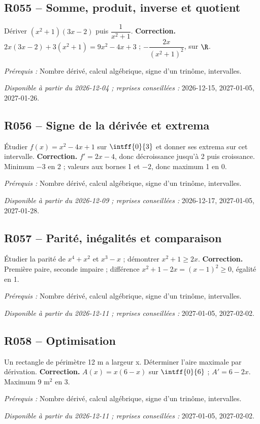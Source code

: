 \subsection*{R055 -- Somme, produit, inverse et quotient}\label{R055}
Dériver $(x^2+1)(3x-2)$ puis $\dfrac{1}{x^2+1}$.
\ifmxteacher\textbf{Correction.} $2x(3x-2)+3(x^2+1)=9x^2-4x+3$ ; $-\dfrac{2x}{(x^2+1)^2}$, sur $\R$.\par\textit{Prérequis :} Nombre dérivé, calcul algébrique, signe d’un trinôme, intervalles.\par\textit{Disponible à partir du 2026-12-04 ; reprises conseillées :} 2026-12-15, 2027-01-05, 2027-01-26.\fi
{}\subsection*{R056 -- Signe de la dérivée et extrema}\label{R056}
Étudier $f(x)=x^2-4x+1$ sur $\intff{0}{3}$ et donner ses extrema sur cet intervalle.
\ifmxteacher\textbf{Correction.} $f\prime=2x-4$, donc décroissance jusqu’à 2 puis croissance. Minimum $-3$ en 2 ; valeurs aux bornes 1 et $-2$, donc maximum 1 en 0.\par\textit{Prérequis :} Nombre dérivé, calcul algébrique, signe d’un trinôme, intervalles.\par\textit{Disponible à partir du 2026-12-09 ; reprises conseillées :} 2026-12-17, 2027-01-05, 2027-01-28.\fi
{}\subsection*{R057 -- Parité, inégalités et comparaison}\label{R057}
Étudier la parité de $x^4+x^2$ et $x^3-x$ ; démontrer $x^2+1\geq2x$.
\ifmxteacher\textbf{Correction.} Première paire, seconde impaire ; différence $x^2+1-2x=(x-1)^2\geq0$, égalité en 1.\par\textit{Prérequis :} Nombre dérivé, calcul algébrique, signe d’un trinôme, intervalles.\par\textit{Disponible à partir du 2026-12-11 ; reprises conseillées :} 2027-01-05, 2027-02-02.\fi
{}\subsection*{R058 -- Optimisation}\label{R058}
Un rectangle de périmètre 12 m a largeur x. Déterminer l’aire maximale par dérivation.
\ifmxteacher\textbf{Correction.} $A(x)=x(6-x)$ sur $\intff{0}{6}$ ; $A\prime=6-2x$. Maximum 9 m$^2$ en 3.\par\textit{Prérequis :} Nombre dérivé, calcul algébrique, signe d’un trinôme, intervalles.\par\textit{Disponible à partir du 2026-12-11 ; reprises conseillées :} 2027-01-05, 2027-02-02.\fi
